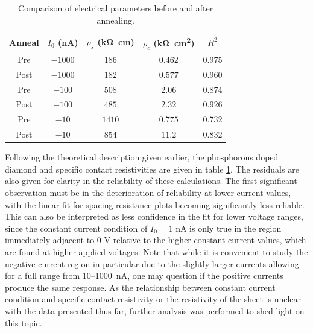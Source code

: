 \begin{refsection}
\begin{table}[H]
\centering
\caption{Comparison of electrical parameters before and after annealing.}
\label{tab:comparison-electrical-parameters}
\begin{tabular}{|c|c|c|c|c|}
\hline
Anneal & $I_0$ (\si{\nano\ampere}) & $\rho_s$ (\si{\kilo\ohm\centi\metre}) & $\rho_c$ (\si{\kilo\ohm\centi\metre\squared}) & $R^2$ \\ \hline
Pre  & $-1000$ & $186$ & $0.462$   & 0.975 \\ \hline
Post & $-1000$ & $182$ & $0.577$   & 0.960 \\ \hline
Pre  & $-100$ & $508$ & $2.06$  & 0.874 \\ \hline
Post & $-100$ & $485$ & $2.32$  & 0.926 \\ \hline
Pre  & $-10$ & $1410$ & $0.775$  & 0.732 \\ \hline
Post & $-10$ & $854$ & $11.2$ & 0.832 \\ \hline
\end{tabular}
\end{table}

Following the theoretical description given earlier, the phosphorous doped diamond and specific contact resistivities are given in table \ref{tab:comparison-electrical-parameters}. The residuals are also given for clarity in the reliability of these calculations. The first significant observation must be in the deterioration of reliability at lower current values, with the linear fit for spacing-resistance plots becoming significantly less reliable. This can also be interpreted as less confidence in the fit for lower voltage ranges, since the constant current condition of $I_{0} = 1$ \si{\nano\ampere} is only true in the region immediately adjacent to 0 \si{\volt} relative to the higher constant current values, which are found at higher applied voltages. Note that while it is convenient to study the negative current region in particular due to the slightly larger currents allowing for a full range from 10--1000~\si{\nano\ampere}, one may question if the positive currents produce the same response. As the relationship between constant current condition and specific contact resistivity or the resistivity of the sheet is unclear with the data presented thus far, further analysis was performed to shed light on this topic.


\end{refsection}
